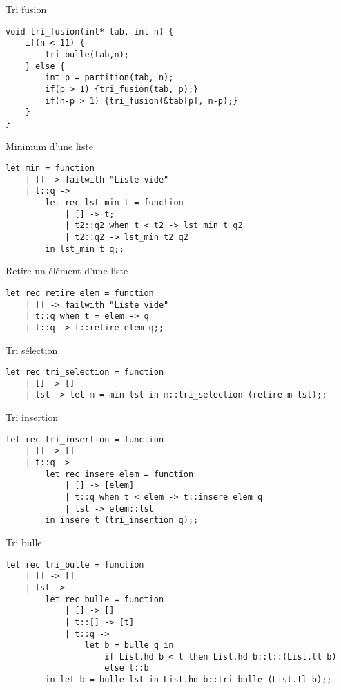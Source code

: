 \begin{imp*}{Tri fusion}
\begin{verbatim}
void tri_fusion(int* tab, int n) {
    if(n < 11) {
        tri_bulle(tab,n);
    } else {
        int p = partition(tab, n);
        if(p > 1) {tri_fusion(tab, p);}
        if(n-p > 1) {tri_fusion(&tab[p], n-p);}
    }
}
\end{verbatim}
\end{imp*}
\ocaml
\begin{imp*}{Minimum d'une liste}
\begin{verbatim}
let min = function
    | [] -> failwith "Liste vide"
    | t::q ->
        let rec lst_min t = function
            | [] -> t;
            | t2::q2 when t < t2 -> lst_min t q2
            | t2::q2 -> lst_min t2 q2
        in lst_min t q;;
\end{verbatim}
\end{imp*}
\begin{imp*}{Retire un élément d'une liste}
\begin{verbatim}
let rec retire elem = function
    | [] -> failwith "Liste vide"
    | t::q when t = elem -> q
    | t::q -> t::retire elem q;;
\end{verbatim}
\end{imp*}
\begin{imp*}{Tri sélection}
\begin{verbatim}
let rec tri_selection = function
    | [] -> []
    | lst -> let m = min lst in m::tri_selection (retire m lst);;
\end{verbatim}
\end{imp*}
\begin{imp*}{Tri insertion}
\begin{verbatim}
let rec tri_insertion = function
    | [] -> []
    | t::q ->
        let rec insere elem = function
            | [] -> [elem]
            | t::q when t < elem -> t::insere elem q
            | lst -> elem::lst
        in insere t (tri_insertion q);;
\end{verbatim}
\end{imp*}
\begin{imp*}{Tri bulle}
\begin{verbatim}
let rec tri_bulle = function
    | [] -> []
    | lst ->
        let rec bulle = function
            | [] -> []
            | t::[] -> [t]
            | t::q ->
                let b = bulle q in
                    if List.hd b < t then List.hd b::t::(List.tl b)
                    else t::b
        in let b = bulle lst in List.hd b::tri_bulle (List.tl b);;
\end{verbatim}
\end{imp*}
